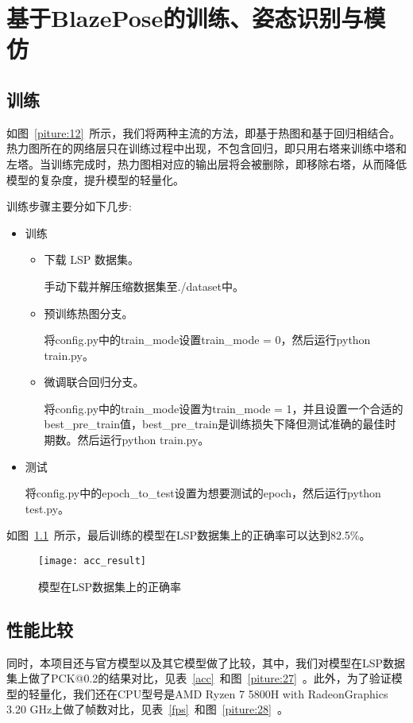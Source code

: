 
\chapter{基于BlazePose的训练、姿态识别与模仿}

\section{训练}
如图~\ref{piture:12}~所示，我们将两种主流的方法，即基于热图和基于回归相结合。热力图所在的网络层只在训练过程中出现，不包含回归，即只用右塔来训练中塔和左塔。当训练完成时，热力图相对应的输出层将会被删除，即移除右塔，从而降低模型的复杂度，提升模型的轻量化。

训练步骤主要分如下几步:
\begin{itemize}
\item 训练

\begin{itemize}
\item 下载 LSP 数据集。

\qquad \qquad 手动下载并解压缩数据集至./dataset中。
\item 预训练热图分支。

\qquad \qquad 将config.py中的train\_mode设置train\_mode = 0，然后运行python train.py。

\item 微调联合回归分支。

\qquad \qquad 将config.py中的train\_mode设置为train\_mode = 1，并且设置一个合适的best\_pre\_train值，best\_pre\_train是训练损失下降但测试准确的最佳时期数。然后运行python train.py。
\end{itemize}

\item 测试

\qquad \quad 将config.py中的epoch\_to\_test设置为想要测试的epoch，然后运行python test.py。
\end{itemize}

如图~\ref{piture:17}~所示，最后训练的模型在LSP数据集上的正确率可以达到82.5\%。

\begin{figure}
\centering
\texttt{[image: acc\_result]}
\caption{模型在LSP数据集上的正确率}
\label{piture:17}
\end{figure}

\section{性能比较}
同时，本项目还与官方模型以及其它模型做了比较，其中，我们对模型在LSP数据集上做了PCK@0.2的结果对比，见表~\ref{acc}~和图~\ref{piture:27}~。此外，为了验证模型的轻量化，我们还在CPU型号是AMD Ryzen 7 5800H with RadeonGraphics 3.20 GHz上做了帧数对比，见表~\ref{fps}~和图~\ref{piture:28}~。


